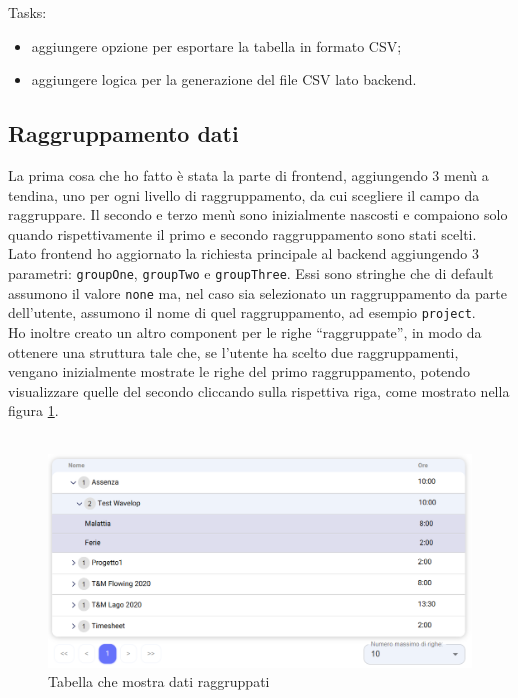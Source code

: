 \noindent Tasks:
\begin{itemize}
  \item aggiungere opzione per esportare la tabella in formato CSV;
  \item aggiungere logica per la generazione del file CSV lato backend.
\end{itemize}


\subsection{Raggruppamento dati}
La prima cosa che ho fatto è stata la parte di frontend, aggiungendo 3 menù a tendina, uno per ogni livello di raggruppamento, da cui scegliere il campo da raggruppare. Il secondo e terzo menù sono inizialmente nascosti e compaiono solo quando rispettivamente il primo e secondo raggruppamento sono stati scelti.\\
Lato frontend ho aggiornato la richiesta principale al backend aggiungendo 3 parametri: \texttt{groupOne}, \texttt{groupTwo} e \texttt{groupThree}. Essi sono stringhe che di default assumono il valore \texttt{none} ma, nel caso sia selezionato un raggruppamento da parte dell'utente, assumono il nome di quel raggruppamento, ad esempio \texttt{project}.\\
Ho inoltre creato un altro component per le righe ``raggruppate'', in modo da ottenere una struttura tale che, se l'utente ha scelto due raggruppamenti, vengano inizialmente mostrate le righe del primo raggruppamento, potendo visualizzare quelle del secondo cliccando sulla rispettiva riga, come mostrato nella figura \ref{fig:report_groupedtable}.\\\\
\begin{figure}[H]
	\includegraphics[width = \textwidth]{immagini/reports table groupings.png}
	\caption{Tabella che mostra dati raggruppati}
	\label{fig:report_groupedtable}
\end{figure}
